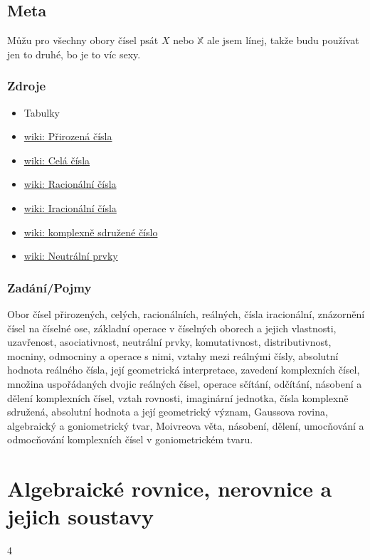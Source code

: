 \documentclass[12pt]{article}
\begin{document}
\subsection{Meta}
Můžu pro všechny obory čísel psát $X$ nebo $\mathbb{X}$ ale jsem línej, takže budu používat jen to druhé, bo je to víc sexy.
\subsubsection{Zdroje}
\begin{itemize}
\item Tabulky
\item \href{https://cs.wikipedia.org/wiki/P\%C5\%99irozen\%C3\%A9_\%C4\%8D\%C3\%ADslo}{wiki: Přirozená čísla}
\item \href{https://cs.wikipedia.org/wiki/Cel\%C3\%A9_\%C4\%8D\%C3\%ADslo}{wiki: Celá čísla}
\item \href{https://cs.wikipedia.org/wiki/Racion\%C3\%A1ln\%C3\%AD_\%C4\%8D\%C3\%ADslo}{wiki: Racionální čísla}
\item \href{https://cs.wikipedia.org/wiki/Iracion\%C3\%A1ln\%C3\%AD_\%C4\%8D\%C3\%ADslo}{wiki: Iracionální čísla}
\item \href{https://cs.wikipedia.org/wiki/Komplexn\%C4\%9B_sdru\%C5\%BEen\%C3\%A9_\%C4\%8D\%C3\%ADslo}{wiki: komplexně sdružené číslo}
\item \href{https://cs.wikipedia.org/wiki/Neutr\%C3\%A1ln\%C3\%AD_prvek}{wiki: Neutrální prvky}
\end{itemize}
\subsubsection{Zadání/Pojmy}
Obor čísel přirozených, celých, racionálních, reálných, čísla iracionální, znázornění čísel na číselné ose, základní operace v číselných oborech a jejich vlastnosti, uzavřenost, asociativnost, neutrální prvky, komutativnost, distributivnost, mocniny, odmocniny a operace s nimi, vztahy mezi reálnými čísly, absolutní hodnota reálného čísla, její geometrická interpretace, zavedení komplexních čísel, množina uspořádaných dvojic reálných čísel, operace sčítání, odčítání, násobení a dělení komplexních čísel, vztah rovnosti, imaginární jednotka, čísla komplexně sdružená, absolutní hodnota a její geometrický význam, Gaussova rovina, algebraický a goniometrický tvar, Moivreova věta, násobení, dělení, umocňování a odmocňování komplexních čísel v goniometrickém tvaru.

\section{Algebraické rovnice, nerovnice a jejich soustavy}
4
\end{document}

